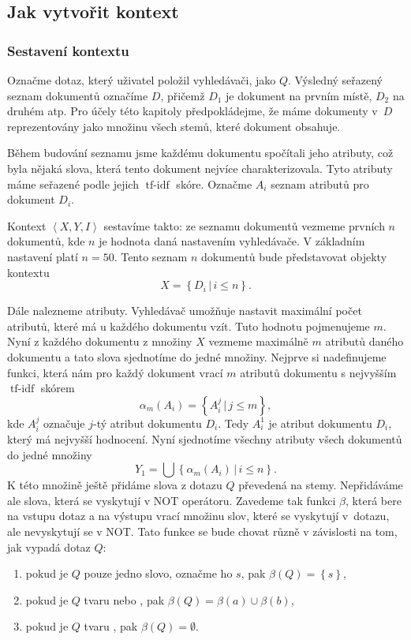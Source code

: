 \documentclass{article}
\newcommand{\sep}{\,|\,}
\newcommand{\ssection}[1]{\subsection{#1}}
\newcommand{\sssection}[1]{\subsubsection{#1}}
\newcommand{\adds}[1]{\left\{#1\right\}}
\newcommand{\addsp}[1]{\left<#1\right>}
\DeclareMathOperator{\tfidf}{tf-idf}
\newcommand{\context}{\addsp{X, Y, I}}
\begin{document}
\ssection{Jak vytvořit kontext}
\sssection{Sestavení kontextu}
\label{ch.sestaveni}
Označme dotaz, který uživatel položil vyhledávači, jako $Q$. Výsledný seřazený seznam dokumentů označíme $D$, přičemž $D_1$ je dokument na prvním místě, $D_2$ na druhém atp. Pro účely této kapitoly předpokládejme, že máme dokumenty v~$D$ reprezentovány jako množinu všech stemů, které dokument obsahuje. 

Během budování seznamu jsme každému dokumentu spočítali jeho atributy, což byla nějaká slova, která tento dokument nejvíce charakterizovala. Tyto atributy máme seřazené podle jejich $\tfidf$ skóre. Označme $A_i$ seznam atributů pro dokument $D_i$.

Kontext $\context$ sestavíme takto: ze seznamu dokumentů vezmeme prvních $n$ dokumentů, kde $n$ je hodnota daná nastavením vyhledávače. V základním nastavení platí $n=50$. Tento seznam $n$ dokumentů bude představovat objekty kontextu
$$
X=\adds{D_i\sep i \le n}.
$$

Dále nalezneme atributy. Vyhledávač umožňuje nastavit maximální počet atributů, které má u každého dokumentu vzít. Tuto hodnotu pojmenujeme $m$. Nyní z každého dokumentu z množiny $X$ vezmeme maximálně $m$ atributů daného dokumentu a tato slova sjednotíme do jedné množiny. Nejprve si nadefinujeme funkci, která nám pro každý dokument vrací $m$ atributů dokumentu s nejvyšším $\tfidf$ skórem
$$
\alpha_m(A_i)=\adds{A_i^j\sep j\le m},
$$
kde $A_i^j$ označuje $j$-tý atribut dokumentu $D_i$. Tedy $A_i^1$ je atribut dokumentu $D_i$, který má nejvyšší hodnocení. Nyní sjednotíme všechny atributy všech dokumentů do jedné množiny
$$
Y_1=\bigcup\adds{\alpha_m(A_i)\sep i \le n}.
$$
K této množině ještě přidáme slova z dotazu $Q$ převedená na stemy. Nepřidáváme ale slova, která se vyskytují v NOT operátoru. Zavedeme tak funkci $\beta$, která bere na vstupu dotaz a na výstupu vrací množinu slov, které se vyskytují v~dotazu, ale nevyskytují se v NOT. Tato funkce se bude chovat různě v závislosti na tom, jak vypadá dotaz $Q$:

\begin{enumerate}
	\item pokud je $Q$ pouze jedno slovo, označme ho $s$, pak $\beta(Q)=\adds{s}$,
	\item pokud je $Q$ tvaru  nebo , pak $\beta(Q)=\beta(a)\cup\beta(b)$,
	\item pokud je $Q$ tvaru , pak $\beta(Q)=\emptyset$.
\end{enumerate}
\end{document}
